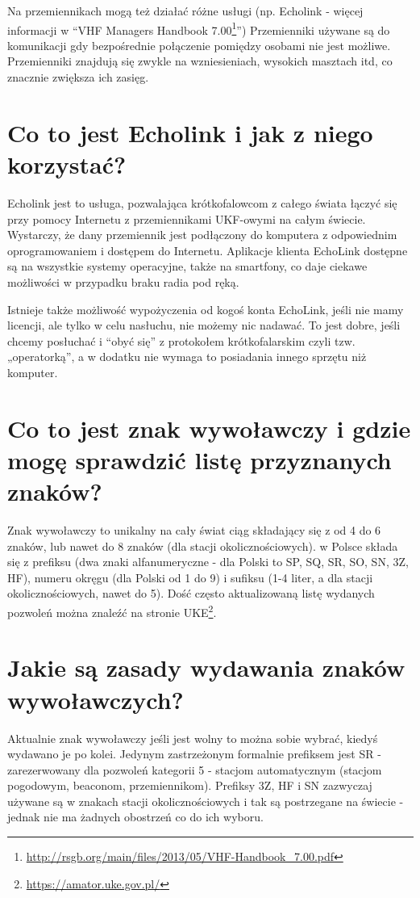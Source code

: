 \documentclass[a4paper,12pt]{article}
\begin{document}
Na przemiennikach mogą też działać różne usługi (np. Echolink - więcej informacji w “VHF Managers Handbook 7.00\footnote{\url{http://rsgb.org/main/files/2013/05/VHF-Handbook_7.00.pdf}}”) Przemienniki używane są do komunikacji gdy bezpośrednie połączenie pomiędzy osobami nie jest możliwe. Przemienniki znajdują się zwykle na wzniesieniach, wysokich masztach itd, co znacznie zwiększa ich zasięg.

\section{Co to jest Echolink i jak z niego korzystać?}
Echolink jest to usługa, pozwalająca krótkofalowcom z całego świata łączyć się przy pomocy Internetu z przemiennikami UKF-owymi na całym świecie. Wystarczy, że dany przemiennik jest podłączony do komputera z odpowiednim oprogramowaniem i dostępem do Internetu.
Aplikacje klienta EchoLink dostępne są na wszystkie systemy operacyjne, także na smartfony, co daje ciekawe możliwości w przypadku braku radia pod ręką.

Istnieje także możliwość wypożyczenia od kogoś konta EchoLink, jeśli nie mamy licencji, ale tylko w celu nasłuchu, nie możemy nic nadawać. To jest dobre, jeśli chcemy posłuchać i “obyć się” z protokołem krótkofalarskim czyli tzw. „operatorką”, a w dodatku nie wymaga to posiadania innego sprzętu niż komputer.

\section{Co to jest znak wywoławczy i gdzie mogę sprawdzić listę przyznanych znaków?}
Znak wywoławczy to unikalny na cały świat ciąg składający się z od 4 do 6 znaków, lub nawet do 8 znaków (dla stacji okolicznościowych). w Polsce składa się z prefiksu (dwa znaki alfanumeryczne - dla Polski to SP, SQ, SR, SO, SN, 3Z, HF), numeru okręgu (dla Polski od 1 do 9) i sufiksu (1-4 liter, a dla stacji okolicznościowych, nawet do 5).
Dość często aktualizowaną listę wydanych pozwoleń można znaleźć na stronie UKE\footnote{\url{https://amator.uke.gov.pl/}}.


\section{Jakie są zasady wydawania znaków wywoławczych?}
Aktualnie znak wywoławczy jeśli jest wolny to można sobie wybrać, kiedyś wydawano je po kolei. Jedynym zastrzeżonym formalnie prefiksem jest SR - zarezerwowany dla pozwoleń kategorii 5 - stacjom automatycznym (stacjom pogodowym, beaconom, przemiennikom). Prefiksy 3Z, HF i SN zazwyczaj używane są w znakach stacji okolicznościowych i tak są postrzegane na świecie - jednak nie ma żadnych obostrzeń co do ich wyboru.
\end{document}
